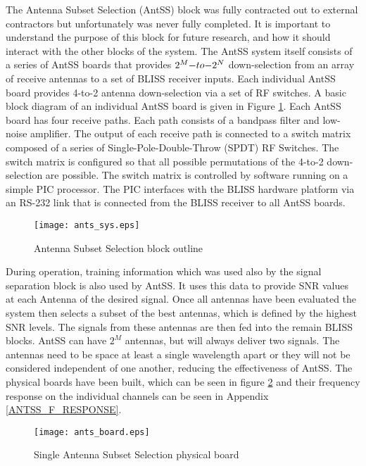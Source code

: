 The Antenna Subset Selection (AntSS) block was fully contracted out to external contractors but unfortunately was never fully completed.  It is important to understand the purpose of this block for future research, and how it should interact with the other blocks of the system.  The AntSS system itself consists of a series of AntSS boards that provides \(2^{M}$$ -to-$$2^{N}\) down-selection from an array of receive antennas to a set of BLISS receiver inputs. Each individual AntSS board provides 4-to-2 antenna down-selection via a set of RF switches. A basic block diagram of an individual AntSS board is given in Figure \ref{ants_sys}.  Each AntSS board has four receive paths. Each path consists of a bandpass filter and low-noise amplifier. The output of each receive path is connected to a switch matrix composed of a series of Single-Pole-Double-Throw (SPDT) RF Switches. The switch matrix is configured so that all possible permutations of the 4-to-2 down-selection are possible. The switch matrix is controlled by software running on a simple PIC processor. The PIC interfaces with the BLISS hardware platform via an RS-232 link that is connected from the BLISS receiver to all AntSS boards.\\

\begin{figure}[!ht]\label{ants_sys}
\centering
\texttt{[image: ants\_sys.eps]}
\caption{Antenna Subset Selection block outline}
\end{figure}

During operation, training information which was used also by the signal separation block is also used by AntSS.  It uses this data to provide SNR values at each Antenna of the desired signal.  Once all antennas have been evaluated the system then selects a subset of the best antennas, which is defined by the highest SNR levels.  The signals from these antennas are then fed into the remain BLISS blocks.  AntSS can have \(2^{M}\) antennas, but will always deliver two signals.  The antennas need to be space at least a single wavelength apart or they will not be considered independent of one another, reducing the effectiveness of AntSS.  The physical boards have been built, which can be seen in figure \ref{antss_boards} and their frequency response on the individual channels can be seen in Appendix \ref{ANTSS_F_RESPONSE}.\\

\begin{figure}[!ht]\label{antss_boards}
\centering
\texttt{[image: ants\_board.eps]}
\caption{Single Antenna Subset Selection physical board}
\end{figure}

